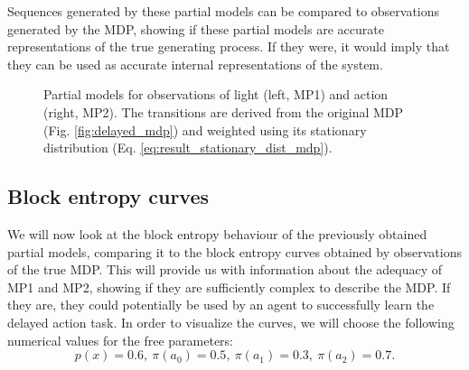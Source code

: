\documentclass[12pt,a4paper]{article}
\begin{document}
Sequences generated by these partial models can be compared to observations generated by the MDP, showing if these partial models are accurate representations of the true generating process.
If they were, it would imply that they can be used as accurate internal representations of the system.

\begin{figure}[H]
    \centering
    \caption{\label{fig:partial_mps} Partial models for observations of light (left, MP1) and action (right, MP2). The transitions are derived from the original MDP (Fig. \ref{fig:delayed_mdp}) and weighted using its stationary distribution (Eq. \ref{eq:result_stationary_dist_mdp}).}
\end{figure}

\subsection{Block entropy curves} \label{ssec:res_block_entropy_curves}
We will now look at the block entropy behaviour of the previously obtained partial models, comparing it to the block entropy curves obtained by observations of the true MDP.
This will provide us with information about the adequacy of MP1 and MP2, showing if they are sufficiently complex to describe the MDP.
If they are, they could potentially be used by an agent to successfully learn the delayed action task.
In order to visualize the curves, we will choose the following numerical values for the free parameters:
\begin{equation}
    \label{eq:numerical_params}
    p(x)=0.6,\ \pi(a_0)=0.5,\ \pi(a_1)=0.3,\ \pi(a_2)=0.7.
\end{equation}
\end{document}
